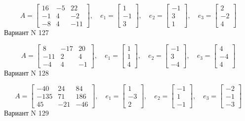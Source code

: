 \documentclass[11pt]{report}
\begin{document}
$$A = \left[\begin{matrix}16 & -5 & 22\\-1 & 4 & -2\\-8 & 4 & -11\end{matrix}\right],\quad e_1 = \left[\begin{matrix}1\\-1\\3\end{matrix}\right],\quad e_2 = \left[\begin{matrix}-1\\3\\1\end{matrix}\right],\quad e_3 = \left[\begin{matrix}2\\-2\\4\end{matrix}\right]$$Вариант N 127

$$A = \left[\begin{matrix}8 & -17 & 20\\-11 & 2 & 4\\-4 & 4 & -1\end{matrix}\right],\quad e_1 = \left[\begin{matrix}1\\1\\4\end{matrix}\right],\quad e_2 = \left[\begin{matrix}-1\\3\\-4\end{matrix}\right],\quad e_3 = \left[\begin{matrix}4\\-4\\4\end{matrix}\right]$$Вариант N 128

$$A = \left[\begin{matrix}-40 & 24 & 84\\-135 & 71 & 186\\45 & -21 & -46\end{matrix}\right],\quad e_1 = \left[\begin{matrix}1\\-3\\2\end{matrix}\right],\quad e_2 = \left[\begin{matrix}-1\\1\\-1\end{matrix}\right],\quad e_3 = \left[\begin{matrix}-2\\-1\\-3\end{matrix}\right]$$Вариант N 129
\end{document}
